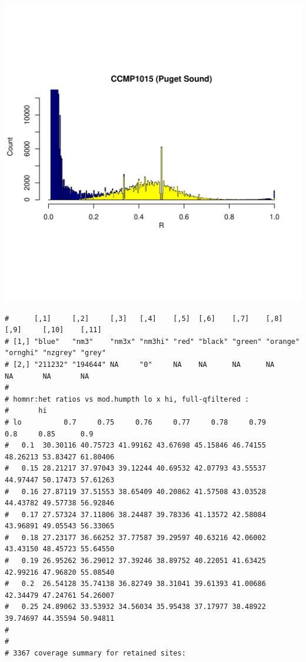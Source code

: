\documentclass{article}\usepackage[]{graphicx}\usepackage[]{color}
\makeatletter
\def\maxwidth{ %
  \ifdim\Gin@nat@width>\linewidth
    \linewidth
  \else
    \Gin@nat@width
  \fi
}
\newenvironment{kframe}{%
 \def\at@end@of@kframe{}%
 \ifinner\ifhmode%
  \def\at@end@of@kframe{\end{minipage}}%
  \begin{minipage}{\columnwidth}%
 \fi\fi%
 \def\FrameCommand##1{\hskip\@totalleftmargin \hskip-\fboxsep
 \colorbox{shadecolor}{##1}\hskip-\fboxsep
     \hskip-\linewidth \hskip-\@totalleftmargin \hskip\columnwidth}%
 \MakeFramed {\advance\hsize-\width
   \@totalleftmargin\z@ \linewidth\hsize
   \@setminipage}}%
 {\par\unskip\endMakeFramed%
 \at@end@of@kframe}
\newenvironment{knitrout}{}{} %
\makeatother
\begin{document}
\begin{knitrout}
\includegraphics[width=\maxwidth]{FigS7-hwe-histo-figs-knitr/unnamed-chunk-10-37} 
\begin{kframe}\begin{verbatim}
#      [,1]     [,2]     [,3]   [,4]    [,5]  [,6]    [,7]    [,8]     [,9]     [,10]    [,11] 
# [1,] "blue"   "nm3"    "nm3x" "nm3hi" "red" "black" "green" "orange" "ornghi" "nzgrey" "grey"
# [2,] "211232" "194644" NA     "0"     NA    NA      NA      NA       NA       NA       NA
# 
# homnr:het ratios vs mod.humpth lo x hi, full-qfiltered :
#       hi
# lo          0.7     0.75     0.76     0.77     0.78     0.79      0.8     0.85      0.9
#   0.1  30.30116 40.75723 41.99162 43.67698 45.15846 46.74155 48.26213 53.83427 61.80406
#   0.15 28.21217 37.97043 39.12244 40.69532 42.07793 43.55537 44.97447 50.17473 57.61263
#   0.16 27.87119 37.51553 38.65409 40.20862 41.57508 43.03528 44.43782 49.57738 56.92846
#   0.17 27.57324 37.11806 38.24487 39.78336 41.13572 42.58084 43.96891 49.05543 56.33065
#   0.18 27.23177 36.66252 37.77587 39.29597 40.63216 42.06002 43.43150 48.45723 55.64550
#   0.19 26.95262 36.29012 37.39246 38.89752 40.22051 41.63425 42.99216 47.96820 55.08540
#   0.2  26.54128 35.74138 36.82749 38.31041 39.61393 41.00686 42.34479 47.24761 54.26007
#   0.25 24.89062 33.53932 34.56034 35.95438 37.17977 38.48922 39.74697 44.35594 50.94811
# 
# 
# 3367 coverage summary for retained sites:

\end{verbatim}
\end{kframe}
\end{knitrout}
\end{document}
